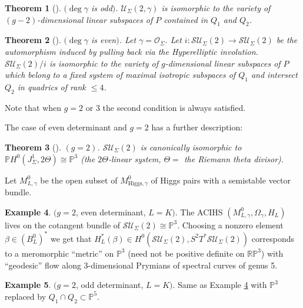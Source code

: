 \documentclass[12pt,a4paper,oneside,english]{smfart}
\newtheorem{thm}{Theorem}[section]
\theoremstyle{definition}
\newtheorem{exmp}[thm]{Example}
\theoremstyle{remark}
\newcommand{\Hig}{\mathrm{Higgs}}
\newcommand{\cU}{\mathcal{U}}
\newcommand{\cO}{\mathcal{O}}
\begin{document}
\begin{thm}[\cite{D-R}]\label{t9.11}
$(\deg \gamma$ is odd$)$. $\cU_\Sigma(2, \gamma)$ is isomorphic to the variety of $(g-2)$-dimensional linear subspaces of $P$ contained in $Q_1$ and $Q_2$.
\end{thm}

\begin{thm}[\cite{D-R}]\label{t9.12}
$(\deg \gamma$ is even$)$. Let $\gamma = \cO_\Sigma$. Let $i \colon \mathcal{SU}_\Sigma(2) \to \mathcal{SU}_\Sigma(2)$ be the automorphism induced by pulling back via the Hyperelliptic involution. $\mathcal{SU}_\Sigma(2)/i$ is isomorphic to the variety of $g$-dimensional linear subspaces of $P$ which belong to a fixed system of maximal isotropic subspaces of $Q_1$ and intersect $Q_2$ in quadrics of rank $\leqslant 4$.
\end{thm}

Note that when $g = 2$ or $3$ the second condition is always satisfied.

The case of even determinant and $g = 2$ has a further description:

\begin{thm}[\cite{N-R}]\label{t9.13}
$(g = 2)$. $\mathcal{SU}_\Sigma(2)$ is canonically isomorphic to $\mathbb{P}H^0(J_\Sigma^1, 2\Theta) \cong \mathbb{P}^3$ (the $2\Theta$-linear system, $\Theta = $ the Riemann theta divisor).
\end{thm}

Let $M^0_{L, \gamma}$ be the open subset of $M^0_{\Hig, \gamma}$ of Higgs pairs with a semistable vector bundle.

\begin{exmp}\label{t9.14}
$(g = 2$, even determinant, $L = K)$. The ACIHS $(M^0_{L, \gamma}, \Omega_\gamma, H_L)$ lives on the cotangent bundle of $\mathcal{SU}_\Sigma(2) \cong \mathbb{P}^3$. Choosing a nonzero element $\beta \in (B_L^0)^*$ we get that $H_L^*(\beta) \in H^0(\mathcal{SU}_\Sigma(2), S^2 T^*\mathcal{SU}_\Sigma(2))$ corresponds to a meromorphic ``metric'' on $\mathbb{P}^3$ (need not be positive definite on $\mathbb{R}\mathbb{P}^3$) with ``geodesic'' flow along 3-dimensional Prymians of spectral curves of genus 5.
\end{exmp}

\begin{exmp}\label{t9.15}
$(g = 2$, odd determinant, $L = K)$. Same as Example \ref{t9.14} with $\mathbb{P}^3$ replaced by $Q_1 \cap Q_2 \subset \mathbb{P}^5$.
\end{exmp}
\end{document}
